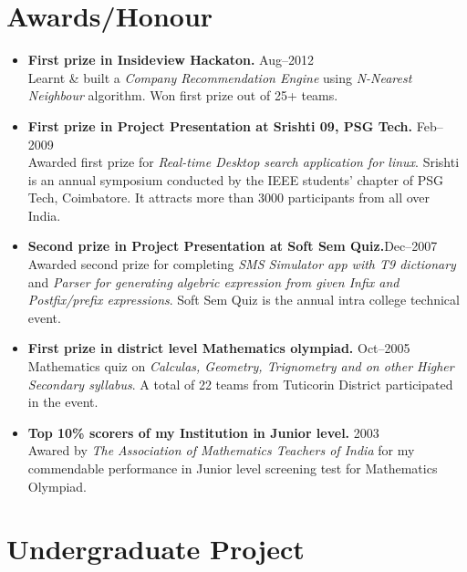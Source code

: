 \documentclass{cv}
\begin{document}
\section{Awards/Honour}
\begin{itemize}[label={$\ast$}]
  \item \textbf{First prize in Insideview Hackaton.} \hfill Aug--2012\\
    Learnt \& built a \textit{Company Recommendation Engine} using \textit{N-Nearest Neighbour} algorithm.  Won first prize out of 25+ teams.
  \item \textbf{First prize in Project Presentation at Srishti 09, PSG Tech.} \hfill Feb--2009\\
    Awarded first prize for \textit{Real-time Desktop search application for linux}. Srishti is an annual symposium conducted by the IEEE students' chapter of PSG Tech, Coimbatore.  It attracts more than 3000 participants from all over India.
  \item \textbf{Second prize in Project Presentation at Soft Sem Quiz.}\hfill Dec--2007\\
    Awarded second prize for completing \textit{SMS Simulator app with T9 dictionary} and \textit{Parser for generating algebric expression from given Infix and Postfix/prefix expressions}.  Soft Sem Quiz is the annual intra college technical event.
  \item \textbf{First prize in district level Mathematics olympiad.} \hfill Oct--2005\\
    Mathematics quiz on \textit{Calculas, Geometry, Trignometry and on other Higher Secondary syllabus}.  A total of 22 teams from Tuticorin District participated in the event.
  \item \textbf{Top 10\% scorers of my Institution in Junior level.} \hfill 2003\\
    Awared by \textit{The Association of Mathematics Teachers of India} for my commendable performance in Junior level screening test for Mathematics Olympiad.
\end{itemize}

\section{Undergraduate Project}
\end{document}
